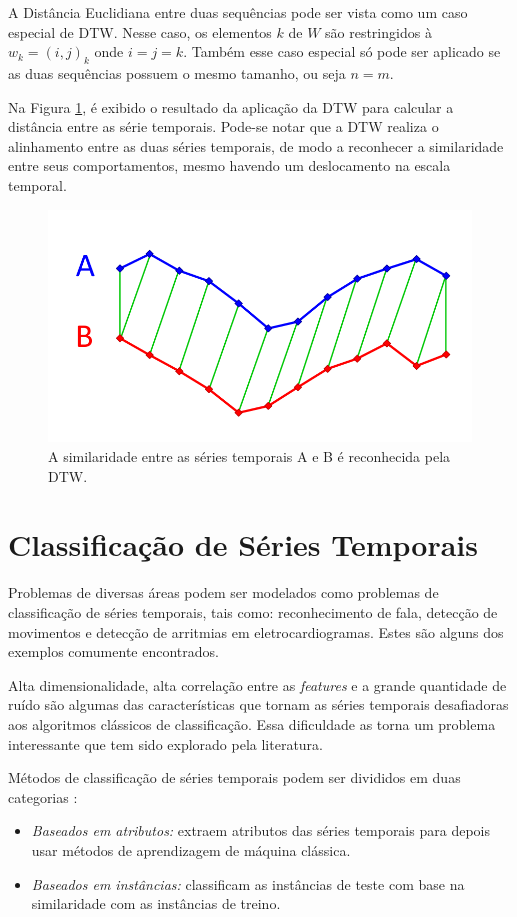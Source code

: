 A Distância Euclidiana entre duas sequências pode ser vista como um caso especial de DTW. Nesse caso, os elementos $k$ de $W$ são restringidos à $w_k = (i,j)_k$ onde $i=j= k$. Também esse caso especial só pode ser aplicado se as duas sequências possuem o mesmo tamanho, ou seja $n=m$.

Na Figura \ref{fig-dtw2}, é exibido o resultado da aplicação da DTW para calcular a distância entre as série temporais. Pode-se notar que a DTW realiza o alinhamento entre as duas séries temporais, de modo a reconhecer a similaridade entre seus comportamentos, mesmo havendo um deslocamento na escala temporal.

\begin{figure}[H]
	\centering
	\includegraphics[scale=0.3]{pasta1_figuras/dtw-ex2.png}
	\caption {A similaridade entre as séries temporais A e B é reconhecida pela DTW. \cite{ferraz2016}}
	\label{fig-dtw2}
\end{figure}

\section{Classificação de Séries Temporais}
Problemas de diversas áreas podem ser modelados como problemas de classificação de séries temporais, tais como: reconhecimento de fala, detecção de movimentos e detecção de arritmias em eletrocardiogramas. Estes são alguns dos exemplos comumente encontrados.

Alta dimensionalidade, alta correlação entre as \textit{features} e a grande quantidade de ruído são algumas das características que tornam as séries temporais desafiadoras aos algoritmos clássicos de classificação. Essa dificuldade as torna um problema interessante que tem sido explorado pela literatura.

Métodos de classificação de séries temporais podem ser divididos em duas categorias \cite{Deng:2013}:
\begin{itemize}
	\item \textit{Baseados em atributos: } extraem atributos das séries temporais para depois usar métodos de aprendizagem de máquina clássica.
	\item \textit{Baseados em instâncias: } classificam as instâncias de teste com base na similaridade com as instâncias de treino.
\end{itemize}

